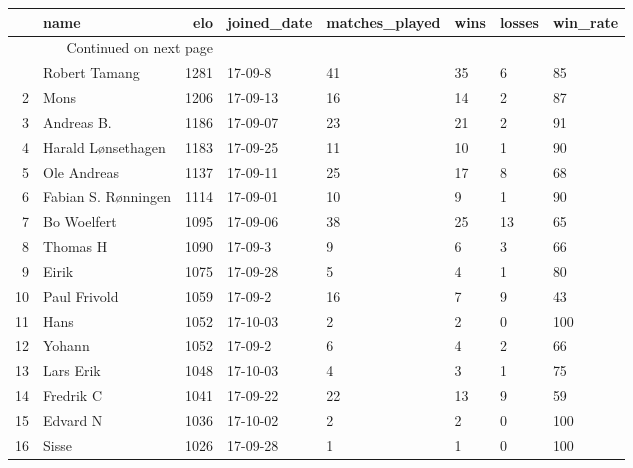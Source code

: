 \begin{longtable}{|r|l|r|l|l|l|l|l|}
\toprule
{} &                 name &   elo & joined\_date &  matches\_played &  wins &  losses &  win\_rate \\
\midrule
\endhead
\midrule
\multicolumn{3}{r}{{Continued on next page}} \\
\midrule
\endfoot

\bottomrule
\endlastfoot
1  &        Robert Tamang &  1281 &     17-09-8 &              41 &    35 &       6 &        85 \\
2  &                 Mons &  1206 &    17-09-13 &              16 &    14 &       2 &        87 \\
3  &           Andreas B. &  1186 &    17-09-07 &              23 &    21 &       2 &        91 \\
4  &   Harald Lønsethagen &  1183 &    17-09-25 &              11 &    10 &       1 &        90 \\
5  &          Ole Andreas &  1137 &    17-09-11 &              25 &    17 &       8 &        68 \\
6  &  Fabian S. Rønningen &  1114 &    17-09-01 &              10 &     9 &       1 &        90 \\
7  &          Bo Woelfert &  1095 &    17-09-06 &              38 &    25 &      13 &        65 \\
8  &             Thomas H &  1090 &     17-09-3 &               9 &     6 &       3 &        66 \\
9  &                Eirik &  1075 &    17-09-28 &               5 &     4 &       1 &        80 \\
10 &         Paul Frivold &  1059 &     17-09-2 &              16 &     7 &       9 &        43 \\
11 &                 Hans &  1052 &    17-10-03 &               2 &     2 &       0 &       100 \\
12 &               Yohann &  1052 &     17-09-2 &               6 &     4 &       2 &        66 \\
13 &            Lars Erik &  1048 &    17-10-03 &               4 &     3 &       1 &        75 \\
14 &            Fredrik C &  1041 &    17-09-22 &              22 &    13 &       9 &        59 \\
15 &             Edvard N &  1036 &    17-10-02 &               2 &     2 &       0 &       100 \\
16 &                Sisse &  1026 &    17-09-28 &               1 &     1 &       0 &       100 \\

\end{longtable}
